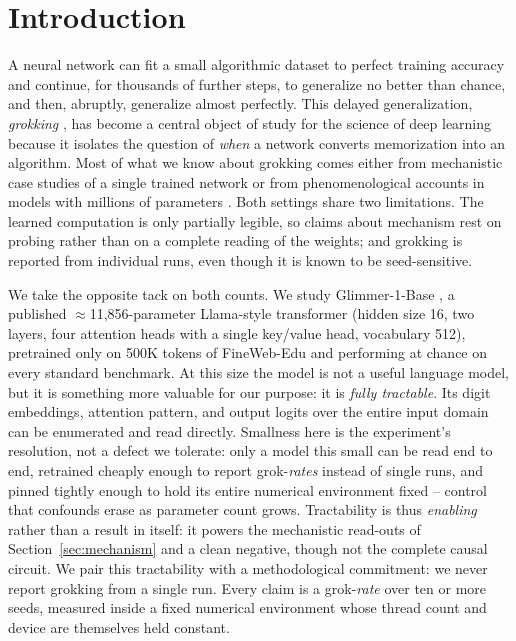 \documentclass[10pt]{article} %
\begin{document}
\section{Introduction}
\label{sec:intro}

A neural network can fit a small algorithmic dataset to perfect training accuracy and continue,
for thousands of further steps, to generalize no better than chance, and then, abruptly,
generalize almost perfectly. This delayed generalization, \emph{grokking} \citep{power2022grokking},
has become a central object of study for the science of deep learning because it isolates the
question of \emph{when} a network converts memorization into an algorithm. Most of what we know
about grokking comes either from mechanistic case studies of a single trained network
\citep{nanda2023progress} or from phenomenological accounts in models with millions of parameters
\citep{liu2022omnigrok,prieto2025edge}. Both settings share two limitations. The learned
computation is only partially legible, so claims about mechanism rest on probing rather than on a
complete reading of the weights; and grokking is reported from individual runs, even though it is
known to be seed-sensitive.

We take the opposite tack on both counts. We study Glimmer-1-Base \citep{glimmer1base2026}, a published
$\approx$11{,}856-parameter Llama-style transformer (hidden size 16, two layers, four attention
heads with a single key/value head, vocabulary 512), pretrained only on 500K tokens of FineWeb-Edu
and performing at chance on every standard benchmark. At this size the model is not a useful
language model, but it is something more valuable for our purpose: it is \emph{fully tractable}.
Its digit embeddings, attention pattern, and output logits over the entire input domain can be
enumerated and read directly. Smallness here is the experiment's resolution, not a defect we
tolerate: only a model this small can be read end to end, retrained cheaply enough to report
grok-\emph{rates} instead of single runs, and pinned tightly enough to hold its entire numerical
environment fixed -- control that confounds erase as parameter count grows. Tractability is thus
\emph{enabling} rather than a result in itself: it powers the mechanistic read-outs of
Section~\ref{sec:mechanism} and a clean negative, though not the complete causal circuit. We pair
this tractability with a methodological commitment: we never
report grokking from a single run. Every claim is a grok-\emph{rate} over ten or more seeds,
measured inside a fixed numerical environment whose thread count and device are themselves held
constant.
\end{document}
